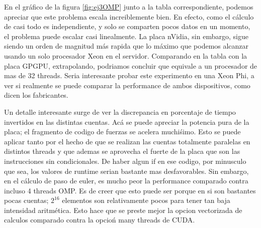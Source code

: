 En el gr\'afico de la figura \ref{fig:ej3OMP} junto a la tabla correspondiente, podemos apreciar que este problema escala
increiblemente bien. En efecto, como el c\'alculo de casi todo es independiente, y solo se comparten pocos datos en un momento,
el problema puede escalar casi linealmente. La placa nVidia, sin embargo, sigue siendo un orden de magnitud m\'as rapida que
lo m\'aximo que podemos alcanzar usando un solo procesador Xeon en el servidor.
Comparando en la tabla con la placa GPGPU, extrapolando, podriamos concluir que equivale a un procesador de mas de 32 threads. 
Seria interesante probar este experimento en una Xeon Phi, a ver si realmente se puede comparar la performance de ambos dispositivos,
como dicen los fabricantes.

Un detalle interesante surge de ver la discrepancia en porcentaje de tiempo invertidos en las distintas cuentas. Ac\'a se puede apreciar
la potencia pura de la placa; el fragmento de codigo de fuerzas se acelera muchi\'simo. Esto se puede aplicar tanto por el hecho de
que se realizan las cuentas totalmente paralelas en distintos threads y que ademas se aprovecha el fuerte de la placa que son
las instrucciones sin condicionales. De haber algun if en ese codigo, por minusculo que sea, los valores de runtime serian bastante
mas desfavorables. Sin embargo, en el c\'alculo de paso de euler, es mucho peor la performance comparado contra incluso 4 threads OMP.
Es de creer que esto puede ser porque en si son bastantes pocas cuentas; $2^{16}$ elementos son relativamente pocos para tener 
tan baja intensidad aritm\'etica. Esto hace que se preste mejor la opcion vectorizada de calculos comparado contra la opcio\'n 
many threads de CUDA. 
